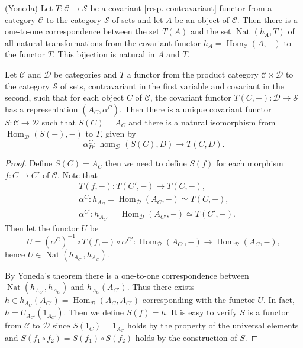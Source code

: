 \documentclass{article}
\DeclareMathOperator{\Hom}{Hom}
\DeclareMathOperator{\Nat}{Nat}
\begin{document}
\begin{corollary}(Yoneda)
    Let $T:\mathscr{C}\to \mathscr{S}$ be a covariant [resp. contravariant] functor from a category $\mathscr{C}$ to the category $\mathscr{S}$ of sets and let $A$ be an object of $\mathscr{C}$. Then there is a one-to-one correspondence between the set $T(A)$ and the set $\operatorname{Nat}_{}(h_A,T)$ of all natural transformations from the covariant functor $h_A=\Hom_{\mathscr{C}}(A,-)$ to the functor $T$. This bijection is natural in $A$ and $T$.
\end{corollary}

\begin{theorem}
    Let $\mathscr{C}$ and $\mathscr{D}$ be categories and $T$ a functor from the product category $\mathscr{C} \times \mathscr{D}$ to the category $\mathscr{S}$ of sets, contravariant in the first variable and covariant in the second, such that for each object $C$ of $\mathscr{C}$, the covariant functor $T(C,-) : \mathscr{D} \to \mathscr{S}$ has a representation $(A_C, \alpha^C)$. Then there is a unique covariant functor $S : \mathscr{C} \to \mathscr{D}$ such that $S(C) = A_C$ and there is a natural isomorphism from $\Hom_{\mathscr{D}}(S(-), -)$ to $T$, given by
    $$\alpha^C_D : \operatorname{hom}_{\mathscr{D}}(S(C), D) \to T(C,D).$$
\end{theorem}
\begin{proof}
    Define $S(C)=A_C$ then we need to define $S(f)$ for each morphism $f:C\to C'$ of $\mathscr{C}$. Note that 
    $$\begin{aligned}
    &T(f,-): T(C',-)\to T(C,-), \\
    &\alpha^C: h_{A_{C}}=\Hom_{\mathscr{D}}(A_C,-) \simeq T(C,-), \\
    &\alpha^{C'}: h_{A_{C'}}=\Hom_{\mathscr{D}}(A_{C'},-) \simeq T(C',-).
    \end{aligned}$$
    Then let the functor $U$ be 
    $$U=(\alpha^C)^{-1} \circ T(f,-) \circ \alpha^{C'}:\Hom_{\mathscr{D}}(A_{C'},-)\to \Hom_{\mathscr{D}}(A_C,-),$$
    hence $U \in \Nat(h_{A_{C'}},h_{A_C})$.

    By Yoneda's theorem there is a one-to-one correspondence between $\Nat(h_{A_{C'}},h_{A_C})$ and $h_{A_C}(A_{C'})$. Thus there exists $h \in h_{A_C}(A_{C'})=\Hom_{\mathscr{D}}(A_C,A_{C'})$ corresponding with the functor $U$. In fact, $h=U_{A_{C'}}(1_{A_{C'}})$. Then we define $S(f)=h$. It is easy to verify $S$ is a functor from $\mathscr{C}$ to $\mathscr{D}$ since $S(1_C)=1_{A_C}$ holds by the property of the universal elements and $S(f_{1} \circ f_{2})=S(f_{1}) \circ S(f_{2})$ holds by the construction of $S$.
\end{proof}
\end{document}
